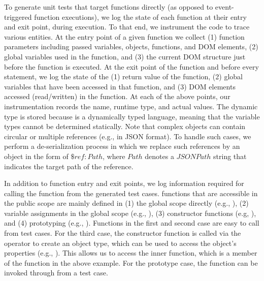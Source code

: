  \label{Sec:jsFuncTesting}
To generate unit tests that target \javascript functions directly (as opposed to event-triggered function executions), we log the state of each function at their entry and exit point, during execution.
To that end, we instrument the code to trace  various entities.
%
At the entry point of a given \javascript function we collect (1) function parameters including passed variables, objects, functions, and DOM elements, (2) global variables used in the function, and (3) the current DOM structure just before the function is executed. At the exit point of the \javascript function and before every  statement, we log the state of the (1) return value of the function, (2) global variables that have been accessed in that function, and (3) DOM elements accessed (read/written) in the function.
At each of the above points, our instrumentation records the name, runtime type, and actual values.
The dynamic type is stored because \javascript is a dynamically typed language, meaning that the variable types cannot be determined statically. 
Note that complex \javascript objects can contain circular or multiple references (e.g., in JSON format). To handle such cases, we perform a de-serialization process in which we replace such references by an object in the form
of ${\$ref: Path}$, where $Path$ denotes a $JSONPath$ string that indicates the target path of the reference.

In addition to function entry and exit points, we log information required for calling  the function from the generated test cases. %
\javascript functions that are accessible in the public scope are mainly defined in  (1) the global scope directly (e.g., ), (2) variable assignments   in the global scope (e.g., ), (3) constructor functions (e.g,  ), and (4) prototyping (e.g., ). 
Functions in the first and second case are easy to call from test cases. For the third case, the constructor function is called via the  operator to create an object type, which can be used to access the object's properties
(e.g., ).
This allows us to access the inner function, which is a member of the  function in the above example.
For the prototype case, the function can be invoked through  from a test case. 

